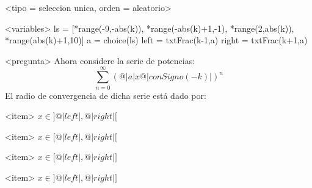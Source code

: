 <tipo = seleccion unica, orden = aleatorio>

<variables>
ls = [*range(-9,-abs(k)), *range(-abs(k)+1,-1), *range(2,abs(k)), *range(abs(k)+1,10)]
a = choice(ls)
left = txtFrac(k-1,a)
right = txtFrac(k+1,a)

<pregunta>
Ahora considere la serie de potencias:
\[ \sum_{n=0}^\infty ( @|a|x @|conSigno(-k)| )^n \]
El radio de convergencia de dicha serie est\'a dado por:

<item>
$x \in \big]@|left|, @|right|\big[$

<item>
$x \in \big[@|left|, @|right|\big[$

<item>
$x \in \big[@|left|, @|right|\big]$

<item>
$x \in \big]@|left|, @|right|\big]$
